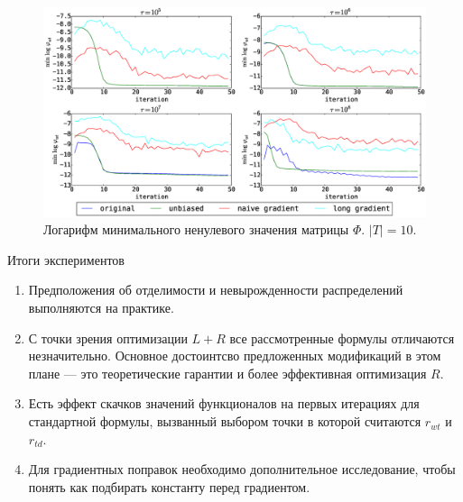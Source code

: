 \documentclass[utf8]{beamer}
\begin{document}
\begin{frame}
\begin{figure}[h]
	\centering
	\caption{Логарифм минимального ненулевого значения матрицы $\Phi$. $|T| = 10$.}    
	\includegraphics[width=1.0\linewidth]{presentation_pictures/topics_10_minPhi_values}
\end{figure}
\end{frame}
	
	
\begin{frame}{Итоги экспериментов}
\begin{enumerate}
\item Предположения об отделимости и невырожденности распределений выполняются на практике.
\item С точки зрения оптимизации $L +  R$ все рассмотренные формулы отличаются незначительно. Основное достоинтсво предложенных модификаций в этом плане --- это теоретические гарантии и более эффективная оптимизация $R$.
\item Есть эффект скачков значений функционалов на первых итерациях для стандартной формулы, вызванный выбором точки в которой считаются $r_{wt}$ и $r_{td}$.
\item Для градиентных поправок необходимо дополнительное исследование, чтобы понять как подбирать константу перед градиентом.
\end{enumerate}
\end{frame}
\end{document}
